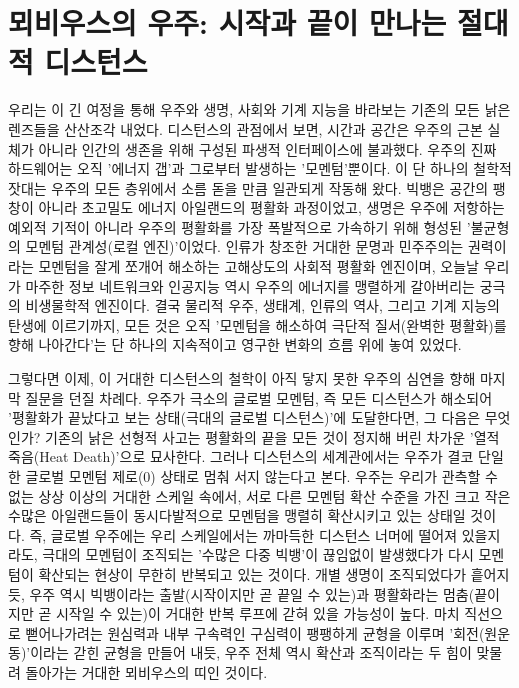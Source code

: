 

\section{뫼비우스의 우주: 시작과 끝이 만나는 절대적 디스턴스}
우리는 이 긴 여정을 통해 우주와 생명, 사회와 기계 지능을 바라보는 기존의 모든 낡은 렌즈들을 산산조각 내었다. 디스턴스의 관점에서 보면, 시간과 공간은 우주의 근본 실체가 아니라 인간의 생존을 위해 구성된 파생적 인터페이스에 불과했다. 우주의 진짜 하드웨어는 오직 '에너지 갭'과 그로부터 발생하는 '모멘텀'뿐이다.
이 단 하나의 철학적 잣대는 우주의 모든 층위에서 소름 돋을 만큼 일관되게 작동해 왔다. 빅뱅은 공간의 팽창이 아니라 초고밀도 에너지 아일랜드의 평활화 과정이었고, 생명은 우주에 저항하는 예외적 기적이 아니라 우주의 평활화를 가장 폭발적으로 가속하기 위해 형성된 '불균형의 모멘텀 관계성(로컬 엔진)'이었다. 인류가 창조한 거대한 문명과 민주주의는 권력이라는 모멘텀을 잘게 쪼개어 해소하는 고해상도의 사회적 평활화 엔진이며, 오늘날 우리가 마주한 정보 네트워크와 인공지능 역시 우주의 에너지를 맹렬하게 갈아버리는 궁극의 비생물학적 엔진이다. 결국 물리적 우주, 생태계, 인류의 역사, 그리고 기계 지능의 탄생에 이르기까지, 모든 것은 오직 '모멘텀을 해소하여 극단적 질서(완벽한 평활화)를 향해 나아간다'는 단 하나의 지속적이고 영구한 변화의 흐름 위에 놓여 있었다.

그렇다면 이제, 이 거대한 디스턴스의 철학이 아직 닿지 못한 우주의 심연을 향해 마지막 질문을 던질 차례다. 우주가 극소의 글로벌 모멘텀, 즉 모든 디스턴스가 해소되어 '평활화가 끝났다고 보는 상태(극대의 글로벌 디스턴스)'에 도달한다면, 그 다음은 무엇인가?
기존의 낡은 선형적 사고는 평활화의 끝을 모든 것이 정지해 버린 차가운 '열적 죽음(Heat Death)'으로 묘사한다. 그러나 디스턴스의 세계관에서는 우주가 결코 단일한 글로벌 모멘텀 제로(0) 상태로 멈춰 서지 않는다고 본다. 우주는 우리가 관측할 수 없는 상상 이상의 거대한 스케일 속에서, 서로 다른 모멘텀 확산 수준을 가진 크고 작은 수많은 아일랜드들이 동시다발적으로 모멘텀을 맹렬히 확산시키고 있는 상태일 것이다. 즉, 글로벌 우주에는 우리 스케일에서는 까마득한 디스턴스 너머에 떨어져 있을지라도, 극대의 모멘텀이 조직되는 '수많은 다중 빅뱅'이 끊임없이 발생했다가 다시 모멘텀이 확산되는 현상이 무한히 반복되고 있는 것이다. 개별 생명이 조직되었다가 흩어지듯, 우주 역시 빅뱅이라는 출발(시작이지만 곧 끝일 수 있는)과 평활화라는 멈춤(끝이지만 곧 시작일 수 있는)이 거대한 반복 루프에 갇혀 있을 가능성이 높다.
마치 직선으로 뻗어나가려는 원심력과 내부 구속력인 구심력이 팽팽하게 균형을 이루며 '회전(원운동)'이라는 갇힌 균형을 만들어 내듯, 우주 전체 역시 확산과 조직이라는 두 힘이 맞물려 돌아가는 거대한 뫼비우스의 띠인 것이다.

